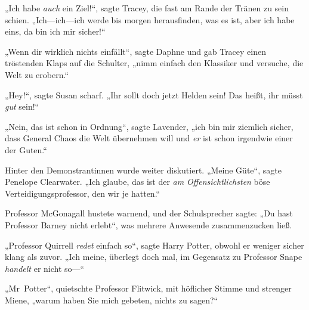 „Ich habe \emph{auch} ein Ziel!“, sagte Tracey, die fast am Rande der Tränen zu sein schien.
„Ich—ich—ich werde bis morgen herausfinden, was es ist, aber ich habe eins, da bin ich mir sicher!“

„Wenn dir wirklich nichts einfällt“, sagte Daphne und gab Tracey einen tröstenden Klaps auf die Schulter, „nimm einfach den Klassiker und versuche, die Welt zu erobern.“

„Hey!“, sagte Susan scharf.
„Ihr sollt doch jetzt Helden sein! Das heißt, ihr müsst \emph{gut} sein!“

„Nein, das ist schon in Ordnung“, sagte Lavender, „ich bin mir ziemlich sicher, dass General Chaos die Welt übernehmen will und \emph{er} ist schon irgendwie einer der Guten.“

Hinter den Demonstrantinnen wurde weiter diskutiert.
„Meine Güte“, sagte Penelope Clearwater.
„Ich glaube, das ist der \emph{am} \emph{Offensichtlichsten} böse Verteidigungsprofessor, den wir je hatten.“

Professor McGonagall hustete warnend, und der Schulsprecher sagte:
„Du hast Professor Barney nicht erlebt“, was mehrere Anwesende zusammenzucken ließ.

„Professor Quirrell \emph{redet} einfach so“, sagte Harry Potter, obwohl er weniger sicher klang als zuvor.
„Ich meine, überlegt doch mal, im Gegensatz zu Professor Snape \emph{handelt} er nicht so—“

„Mr~Potter“, quietschte Professor Flitwick, mit höflicher Stimme und strenger Miene, „warum haben Sie mich gebeten, nichts zu sagen?“

